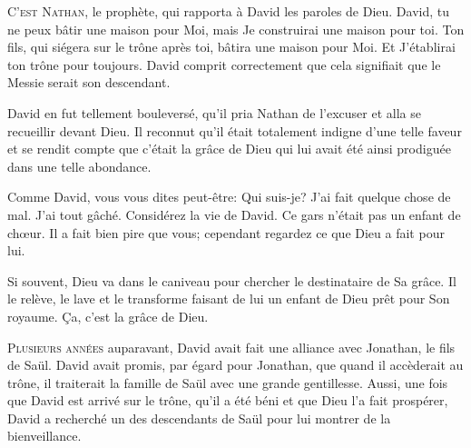 \lettrine{C}{'est Nathan,} le prophète, qui rapporta à David
 les paroles de Dieu.
 \Og David, tu ne peux bâtir une maison pour Moi, mais Je construirai
 une maison pour toi.
 Ton fils, qui siégera sur le trône après toi, bâtira une maison pour Moi.
 Et J'établirai ton trône pour toujours. \Fg{}
 David comprit correctement que cela signifiait
 que le Messie serait son descendant. 

David en fut tellement bouleversé, qu'il pria Nathan de l'excuser
 et alla se recueillir devant Dieu.
 Il reconnut qu'il était totalement indigne d'une telle faveur
 et se rendit compte que c'était la grâce de Dieu qui lui avait été ainsi
 prodiguée dans une telle abondance. 

Comme David, vous vous dites peut-être:
 \Og Qui suis-je? J'ai fait quelque chose de mal. J'ai tout gâché. \Fg{}
 Considérez la vie de David. Ce gars n'était pas un enfant de ch\oe{}ur.
 Il a fait bien pire que vous; cependant regardez ce que Dieu a fait pour lui.


Si souvent, Dieu va dans le caniveau pour chercher le destinataire de Sa grâce.
 Il le relève, le lave et le transforme \ocadr faisant de lui un enfant de Dieu
 prêt pour Son royaume. Ça, c'est la grâce de Dieu. 

\dvrule






\lettrine{P}{lusieurs années} auparavant, David avait fait
 une alliance avec Jonathan, le fils de Saül.
 David avait promis, par égard pour Jonathan,
 que quand il accèderait au trône, il traiterait la famille de Saül
 avec une grande gentillesse.
 Aussi, une fois que David est arrivé sur le trône,
 qu'il a été béni et que Dieu l'a fait prospérer,
 David a recherché un des descendants de Saül
 pour lui montrer de la bienveillance. 

